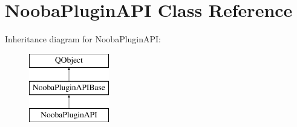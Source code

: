 \hypertarget{class_nooba_plugin_a_p_i}{\section{Nooba\-Plugin\-A\-P\-I Class Reference}
\label{class_nooba_plugin_a_p_i}
}
Inheritance diagram for Nooba\-Plugin\-A\-P\-I\-:\begin{figure}[H]
\begin{center}
\leavevmode
\includegraphics[height=3.000000cm]{class_nooba_plugin_a_p_i}
\end{center}
\end{figure}
